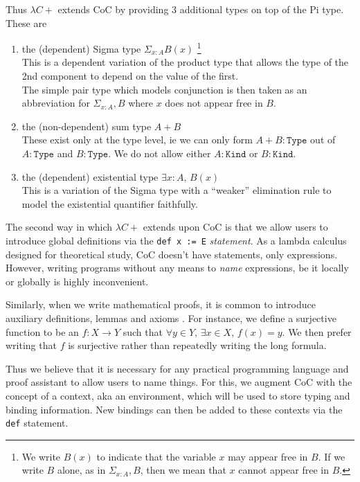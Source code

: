 \documentclass{article}
\begin{document}
Thus $\lambda C+$ extends CoC by providing 3 additional types on top of the
Pi type. These are
\begin{enumerate}
  \item the (dependent) Sigma type $\Sigma_{x : A} B(x)$ 
  \footnote{
    We write $B(x)$ to indicate that the variable $x$ may appear free in $B$.
    If we write $B$ alone, as in $\Sigma_{x : A}, B$, then we mean that $x$
    cannot appear free in $B$.
  }
    \\
    This is a dependent variation of the product type that allows the type 
    of the 2nd component to depend on the value of the first. \\
    The simple pair type which models conjunction is then taken as an
    abbreviation for $\Sigma_{x : A}, B$ where $x$ does not appear free in $B$.

  \item the (non-dependent) sum type $A + B$ \\
    These exist only at the type level, ie we can only form $A + B : \mathtt{Type}$ 
    out of $A : \mathtt{Type}$ and $B : \mathtt{Type}$.
    We do not allow either $A : \mathtt{Kind}$ or $B : \mathtt{Kind}$.

  \item the (dependent) existential type $\exists x : A, \, B(x)$ \\
    This is a variation of the Sigma type with a ``weaker'' elimination rule to
    model the existential quantifier faithfully.
\end{enumerate}

The second way in which $\lambda C+$ extends upon CoC is that we allow users to
introduce global definitions via the \verb|def x := E| \textit{statement}.
As a lambda calculus designed for theoretical study, CoC doesn't have statements,
only expressions.
However, writing programs without any means to \textit{name} expressions, be it
locally or globally is highly inconvenient.

Similarly, when we write mathematical proofs, it is common to introduce
auxiliary definitions, lemmas and axioms \cite{type_theory_and_formal_proof}.
For instance, we define a surjective function to be an $f : X \to Y$ such that
$\forall y \in Y, \, \exists x \in X, \, f(x) = y$. We then prefer writing that
$f$ is surjective rather than repeatedly writing the long formula.

Thus we believe that it is necessary for any practical programming language and
proof assistant to allow users to name things.
For this, we augment CoC with the concept of a context, aka an environment,
which will be used to store typing and binding information.
New bindings can then be added to these contexts via the \texttt{def} statement.
\end{document}
